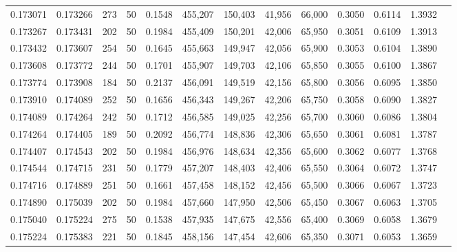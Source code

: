\begin{tabular}{rrrrrrrrrrrrr}
0.173071 & 0.173266 &   273 &  50 &                                     0.1548 & 455,207 & 150,403 &  41,956 &  66,000 & 0.3050 & 0.6114 & 1.3932 \\
0.173267 & 0.173431 &   202 &  50 &                                     0.1984 & 455,409 & 150,201 &  42,006 &  65,950 & 0.3051 & 0.6109 & 1.3913 \\
0.173432 & 0.173607 &   254 &  50 &                                     0.1645 & 455,663 & 149,947 &  42,056 &  65,900 & 0.3053 & 0.6104 & 1.3890 \\
0.173608 & 0.173772 &   244 &  50 &                                     0.1701 & 455,907 & 149,703 &  42,106 &  65,850 & 0.3055 & 0.6100 & 1.3867 \\
0.173774 & 0.173908 &   184 &  50 &                                     0.2137 & 456,091 & 149,519 &  42,156 &  65,800 & 0.3056 & 0.6095 & 1.3850 \\
0.173910 & 0.174089 &   252 &  50 &                                     0.1656 & 456,343 & 149,267 &  42,206 &  65,750 & 0.3058 & 0.6090 & 1.3827 \\
0.174089 & 0.174264 &   242 &  50 &                                     0.1712 & 456,585 & 149,025 &  42,256 &  65,700 & 0.3060 & 0.6086 & 1.3804 \\
0.174264 & 0.174405 &   189 &  50 &                                     0.2092 & 456,774 & 148,836 &  42,306 &  65,650 & 0.3061 & 0.6081 & 1.3787 \\
0.174407 & 0.174543 &   202 &  50 &                                     0.1984 & 456,976 & 148,634 &  42,356 &  65,600 & 0.3062 & 0.6077 & 1.3768 \\
0.174544 & 0.174715 &   231 &  50 &                                     0.1779 & 457,207 & 148,403 &  42,406 &  65,550 & 0.3064 & 0.6072 & 1.3747 \\
0.174716 & 0.174889 &   251 &  50 &                                     0.1661 & 457,458 & 148,152 &  42,456 &  65,500 & 0.3066 & 0.6067 & 1.3723 \\
0.174890 & 0.175039 &   202 &  50 &                                     0.1984 & 457,660 & 147,950 &  42,506 &  65,450 & 0.3067 & 0.6063 & 1.3705 \\
0.175040 & 0.175224 &   275 &  50 &                                     0.1538 & 457,935 & 147,675 &  42,556 &  65,400 & 0.3069 & 0.6058 & 1.3679 \\
0.175224 & 0.175383 &   221 &  50 &                                     0.1845 & 458,156 & 147,454 &  42,606 &  65,350 & 0.3071 & 0.6053 & 1.3659 \\

\end{tabular}
